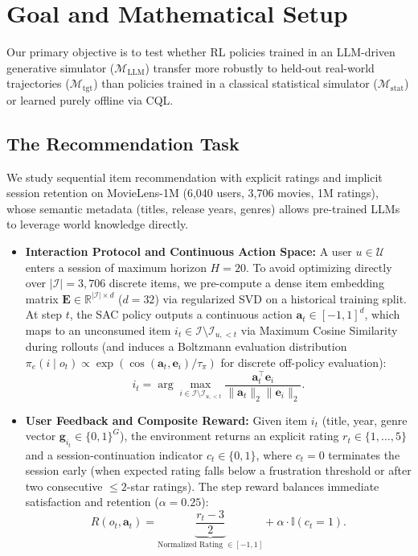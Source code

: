\documentclass{article}
\begin{document}
\section{Goal and Mathematical Setup}
Our primary objective is to test whether RL policies trained in an LLM-driven generative simulator ($\mathcal{M}_{\text{LLM}}$) transfer more robustly to held-out real-world trajectories ($\mathcal{M}_{\text{tgt}}$) than policies trained in a classical statistical simulator ($\mathcal{M}_{\text{stat}}$) or learned purely offline via CQL.

\subsection{The Recommendation Task}
We study sequential item recommendation with explicit ratings and implicit session retention on MovieLens-1M (6,040 users, 3,706 movies, 1M ratings), whose semantic metadata (titles, release years, genres) allows pre-trained LLMs to leverage world knowledge directly.
\begin{itemize}
    \item \textbf{Interaction Protocol and Continuous Action Space:} A user $u \in \mathcal{U}$ enters a session of maximum horizon $H = 20$. To avoid optimizing directly over $|\mathcal{I}| = 3,706$ discrete items, we pre-compute a dense item embedding matrix $\mathbf{E} \in \mathbb{R}^{|\mathcal{I}| \times d}$ ($d=32$) via regularized SVD on a historical training split. At step $t$, the SAC policy outputs a continuous action $\bm{a}_t \in [-1, 1]^d$, which maps to an unconsumed item $i_t \in \mathcal{I} \setminus \mathcal{I}_{u, <t}$ via Maximum Cosine Similarity during rollouts (and induces a Boltzmann evaluation distribution $\pi_e(i \mid o_t) \propto \exp(\cos(\bm{a}_t, \bm{e}_i)/\tau_{\pi})$ for discrete off-policy evaluation):
    \begin{equation}
        i_t = \arg\max_{i \in \mathcal{I} \setminus \mathcal{I}_{u, <t}} \frac{\bm{a}_t^\top \bm{e}_i}{\|\bm{a}_t\|_2 \|\bm{e}_i\|_2}.
    \end{equation}
    \item \textbf{User Feedback and Composite Reward:} Given item $i_t$ (title, year, genre vector $\bm{g}_{i_t} \in \{0,1\}^G$), the environment returns an explicit rating $r_t \in \{1, \dots, 5\}$ and a session-continuation indicator $c_t \in \{0, 1\}$, where $c_t = 0$ terminates the session early (when expected rating falls below a frustration threshold or after two consecutive $\le 2$-star ratings). The step reward balances immediate satisfaction and retention ($\alpha = 0.25$):
    \begin{equation}
        R(o_t, \bm{a}_t) = \underbrace{\frac{r_t - 3}{2}}_{\text{Normalized Rating } \in [-1, 1]} + \alpha \cdot \mathbb{I}(c_t = 1).
    \end{equation}
\end{itemize}
\end{document}
